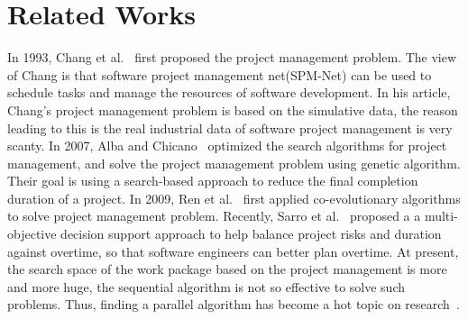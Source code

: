 
\section{Related Works}
\vspace{-2mm}

In 1993, Chang et al.~\cite{chang} first proposed the project management problem. The view of
Chang is that software project management net(SPM-Net) can be used to
schedule tasks and manage the resources of software development.
In his article, Chang's project management problem is based on the simulative
data, the reason leading to this is the real industrial data of software
project management is very scanty. In 2007, Alba and Chicano~\cite{alba} optimized the
search algorithms for project management, and solve the project management
problem using genetic algorithm. Their goal is using a search-based approach
to reduce the final completion duration of a project. In 2009, Ren et al.~\cite{ren} first
applied co-evolutionary algorithms to solve project management problem.
Recently, Sarro et al.~\cite{sarro} proposed a a multi-objective decision support approach to help
balance project risks and duration against overtime, so that software
engineers can better plan overtime.
At present, the search space of the work package based on the project
management is more and more huge, the sequential algorithm is not so
effective to solve such problems. Thus, finding a parallel algorithm has
become a hot topic on research~\cite{pentico}.


